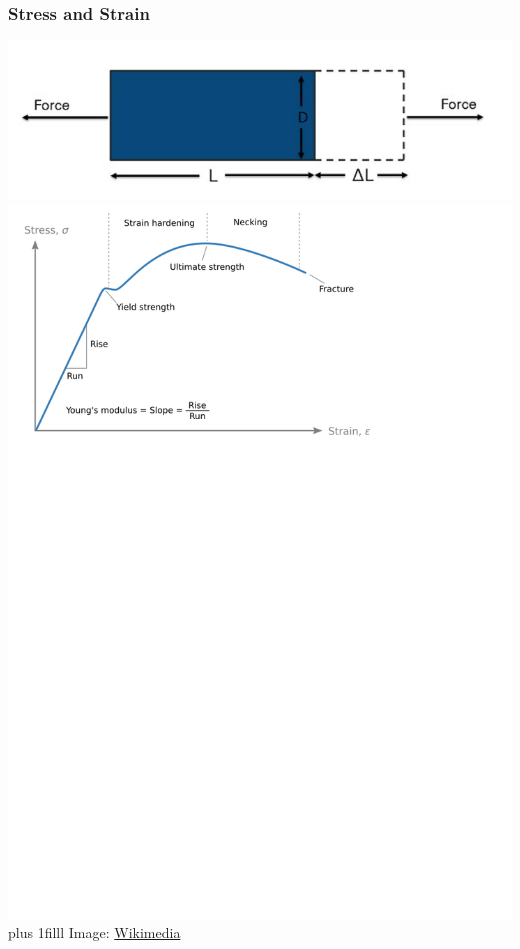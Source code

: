 \documentclass[fleqn]{beamer} %
\newcommand{\sectionIsubsectionIItitle}{Stress and Strain}
\newcommand{\btVFill}{\vskip0pt plus 1filll}
\begin{document}
			\begin{frame}
				\frametitle{\sectionIsubsectionIItitle}\small
				\bigskip

				\includegraphics[scale=.20]{images/strain_fig2.png} \includegraphics[scale=.5]{images/stress_strain_fig1.png} 
				\btVFill
{\tiny Image: \href{https://commons.wikimedia.org/wiki/File:Stress_strain_ductile.svg}{Wikimedia} }

			\end{frame}
\end{document}
